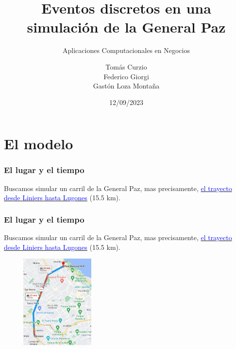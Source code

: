 \documentclass[10pt, compress]{beamer}
\title{Eventos discretos en una simulaci\'on de la General Paz }
\subtitle{Aplicaciones Computacionales en Negocios}
\date{12/09/2023}
\author{Tom\'as Curzio \\ Federico Giorgi \\ Gast\'on Loza Monta\~na  }
\institute{Universidad Torcuato Di Tella}
\begin{document}
\maketitle

\section{El modelo}
\addtocounter{framenumber}{-1}
\begin{frame}[fragile]

\frametitle{El lugar y el tiempo}
Buscamos simular un carril de la General Paz, mas precisamente, \href{https://www.google.com.ar/maps/dir/-34.6549026,-58.5273448/RN+A001,+Buenos+Aires/@-34.5529941,-58.5215513,13z/data=!4m9!4m8!1m0!1m5!1m1!1s0x95bcb6a69ad1fc61:0x7f1d6a8008451498!2m2!1d-58.4682776!2d-34.5357282!3e0?entry=ttu}{\textcolor{blue}{el trayecto desde Liniers hasta Lugones}} (15.5 km). 

\end{frame}

\begin{frame}[fragile]

\frametitle{El lugar y el tiempo}
Buscamos simular un carril de la General Paz, mas precisamente, \href{https://www.google.com.ar/maps/dir/-34.6549026,-58.5273448/RN+A001,+Buenos+Aires/@-34.5529941,-58.5215513,13z/data=!4m9!4m8!1m0!1m5!1m1!1s0x95bcb6a69ad1fc61:0x7f1d6a8008451498!2m2!1d-58.4682776!2d-34.5357282!3e0?entry=ttu}{\textcolor{blue}{el trayecto desde Liniers hasta Lugones}} (15.5 km). 

\begin{figure}
\centering
\includegraphics[width=10em]{gmaps-recorrido}
\end{figure}
\addtocounter{framenumber}{-1}
\end{frame}
\end{document}
